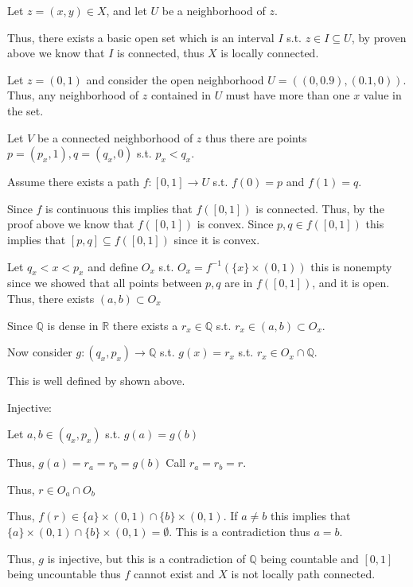 \documentclass[12pt, letterpaper]{article}
\newcommand{\R}{\mathbb{R}}
\newcommand{\Q}{\mathbb{Q}}
\begin{document}
\begin{problemproof}
    Let $z=(x,y) \in X$, and let $U$ be a neighborhood of $z$.

    Thus, there exists a basic open set which is an interval $I$ s.t. $z \in I \subseteq U$, by proven above we know that $I$ is connected, thus $X$ is locally connected.

    Let $z=(0,1)$ and consider the open neighborhood $U=((0,0.9),(0.1,0))$. Thus, any neighborhood of $z$ contained in $U$ must have more than one $x$ value in the set.

    Let $V$ be a connected neighborhood of $z$ thus there are points $p=(p_x,1),q=(q_x,0)$ s.t. $p_x < q_x$.

    Assume there exists a path $f : [0,1] \to U$ s.t. $f(0)=p$ and $f(1)=q$.

    Since $f$ is continuous this implies that $f([0,1])$ is connected. Thus, by the proof above we know that $f([0,1])$ is convex. Since $p,q \in f([0,1])$ this implies that $[p,q] \subseteq f([0,1])$ since it is convex.

    Let $q_x < x < p_x$ and define $O_x$ s.t. $O_x=f^{-1}(\{x\} \times (0,1))$ this is nonempty since we showed that all points between $p,q$ are in $f([0,1])$, and it is open. Thus, there exists $(a,b) \subset O_x$

    Since $\Q$ is dense in $\R$ there exists a $r_x \in \Q$ s.t. $r_x \in (a,b) \subset O_x$.

    Now consider $g: (q_x,p_x) \to \Q$ s.t. $g(x)=r_x$ s.t. $r_x \in O_x \cap \Q$.

    This is well defined by shown above.

    Injective:

    Let $a,b \in (q_x,p_x)$ s.t. $g(a)=g(b)$

    Thus, $g(a)=r_a=r_b=g(b)$ Call $r_a=r_b=r$.

    Thus, $r \in O_a \cap O_b$

    Thus, $f(r) \in \{a\} \times (0,1) \cap \{b\} \times (0,1)$. If $a \neq b$ this implies that $\{a\} \times (0,1) \cap \{b\} \times (0,1) = \emptyset$. This is a contradiction thus $a=b$.

    Thus, $g$ is injective, but this is a contradiction of $\Q$ being countable and $[0,1]$ being uncountable thus $f$ cannot exist and $X$ is not locally path connected.
\end{problemproof}
\end{document}
